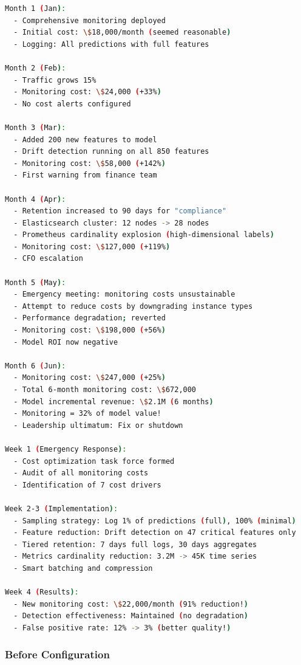 \begin{lstlisting}[language=bash, caption={Cost Explosion Timeline}]
Month 1 (Jan):
  - Comprehensive monitoring deployed
  - Initial cost: \$18,000/month (seemed reasonable)
  - Logging: All predictions with full features

Month 2 (Feb):
  - Traffic grows 15%
  - Monitoring cost: \$24,000 (+33%)
  - No cost alerts configured

Month 3 (Mar):
  - Added 200 new features to model
  - Drift detection running on all 850 features
  - Monitoring cost: \$58,000 (+142%)
  - First warning from finance team

Month 4 (Apr):
  - Retention increased to 90 days for "compliance"
  - Elasticsearch cluster: 12 nodes -> 28 nodes
  - Prometheus cardinality explosion (high-dimensional labels)
  - Monitoring cost: \$127,000 (+119%)
  - CFO escalation

Month 5 (May):
  - Emergency meeting: monitoring costs unsustainable
  - Attempt to reduce costs by downgrading instance types
  - Performance degradation; reverted
  - Monitoring cost: \$198,000 (+56%)
  - Model ROI now negative

Month 6 (Jun):
  - Monitoring cost: \$247,000 (+25%)
  - Total 6-month monitoring cost: \$672,000
  - Model incremental revenue: \$2.1M (6 months)
  - Monitoring = 32% of model value!
  - Leadership ultimatum: Fix or shutdown

Week 1 (Emergency Response):
  - Cost optimization task force formed
  - Audit of all monitoring costs
  - Identification of 7 cost drivers

Week 2-3 (Implementation):
  - Sampling strategy: Log 1% of predictions (full), 100% (minimal)
  - Feature reduction: Drift detection on 47 critical features only
  - Tiered retention: 7 days full logs, 30 days aggregates
  - Metrics cardinality reduction: 3.2M -> 45K time series
  - Smart batching and compression

Week 4 (Results):
  - New monitoring cost: \$22,000/month (91% reduction!)
  - Detection effectiveness: Maintained (no degradation)
  - False positive rate: 12% -> 3% (better quality!)
\end{lstlisting}

\subsubsection{Before Configuration}

